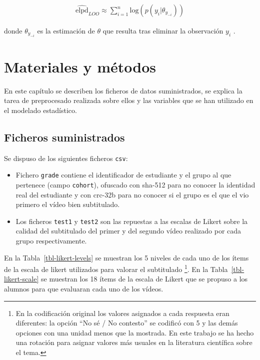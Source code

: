 \documentclass[
  12pt,
  a4paper,
  extrafontsizes,
  onecolumn,
  openright,
  table]{memoir}
\providecommand{\tightlist}{%
  \setlength{\itemsep}{0pt}\setlength{\parskip}{0pt}}\usepackage{longtable,booktabs,array}
\begin{document}
\[
\begin{aligned}
\widehat{\mathrm{elpd}}_{LOO} \approx \sum_{i=1}^{n} \mathrm{log} (p(y_{i} | \theta_{y_{-i}}))
\end{aligned}
\]

donde \(\theta_{y_{-i}}\) es la estimación de \(\theta\) que resulta
tras eliminar la observación \(y_{i}\) \autocite[ver][
pp.~175-176]{gelman2013}.


\hypertarget{sec-metodo}{%
\chapter{Materiales y métodos}\label{sec-metodo}}

En este capítulo se describen los ficheros de datos suministrados, se
explica la tarea de preprocesado realizada sobre ellos y las variables
que se han utilizado en el modelado estadístico.

\hypertarget{ficheros-suministrados}{%
\section{Ficheros suministrados}\label{ficheros-suministrados}}

Se dispuso de los siguientes ficheros \texttt{csv}:

\begin{itemize}
\tightlist
\item
  Fichero \texttt{grade} contiene el identificador de estudiante y el
  grupo al que pertenece (campo \texttt{cohort}), ofuscado con
  \gls{sha}-512 para no conocer la identidad real del estudiante y con
  \gls{crc}-32b para no conocer si el grupo es el que el vio primero el
  vídeo bien subtitulado.
\item
  Los ficheros \texttt{test1} y \texttt{test2} son las repuestas a las
  escalas de Likert sobre la calidad del subtitulado del primer y del
  segundo vídeo realizado por cada grupo respectivamente.
\end{itemize}

En la Tabla~\ref{tbl-likert-levels} se muestran los 5 niveles de cada
uno de los ítems de la \gls{escala de likert} utilizados para valorar el
subtitulado \footnote{En la codificación original los valores asignados
  a cada respuesta eran diferentes: la opción \enquote{No sé / No
  contesto} se codificó con 5 y las demás opciones con una unidad menos
  que la mostrada. En este trabajo se ha hecho una rotación para asignar
  valores más usuales en la literatura científica sobre el tema.}. En la
Tabla~\ref{tbl-likert-scale} se muestran los 18 ítems de la escala de
Likert que se propuso a los alumnos para que evaluaran cada uno de los
vídeos.
\end{document}
